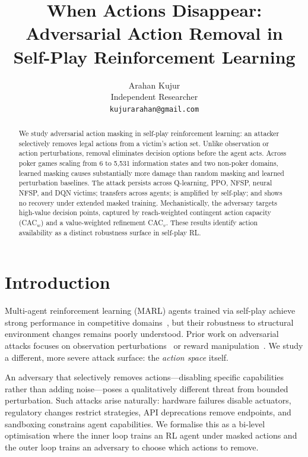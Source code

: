 \documentclass{article}
\title{When Actions Disappear:\\Adversarial Action Removal in Self-Play Reinforcement Learning}
\author{
  Arahan Kujur\\
  Independent Researcher\\
  \texttt{kujurarahan@gmail.com}
}
\begin{document}
\maketitle

\begin{abstract}
We study adversarial action masking in self-play reinforcement learning: an attacker selectively removes legal actions from a victim's action set. Unlike observation or action perturbations, removal eliminates decision options before the agent acts. Across poker games scaling from 6 to 5,531 information states and two non-poker domains, learned masking causes substantially more damage than random masking and learned perturbation baselines. The attack persists across Q-learning, PPO, NFSP, neural NFSP, and DQN victims; transfers across agents; is amplified by self-play; and shows no recovery under extended masked training. Mechanistically, the adversary targets high-value decision points, captured by reach-weighted contingent action capacity (CAC$_w$) and a value-weighted refinement CAC$_v$. These results identify action availability as a distinct robustness surface in self-play RL.
\end{abstract}

\section{Introduction}

Multi-agent reinforcement learning (MARL) agents trained via self-play achieve strong performance in competitive domains~\citep{silver2018general,brown2019superhuman}, but their robustness to structural environment changes remains poorly understood. Prior work on adversarial attacks focuses on observation perturbations~\citep{huang2017adversarial,gleave2020adversarial} or reward manipulation~\citep{zhang2020adaptive}. We study a different, more severe attack surface: the \emph{action space} itself.

An adversary that selectively removes actions---disabling specific capabilities rather than adding noise---poses a qualitatively different threat from bounded perturbation. Such attacks arise naturally: hardware failures disable actuators, regulatory changes restrict strategies, API deprecations remove endpoints, and sandboxing constrains agent capabilities. We formalise this as a bi-level optimisation where the inner loop trains an RL agent under masked actions and the outer loop trains an adversary to choose which actions to remove.
\end{document}
